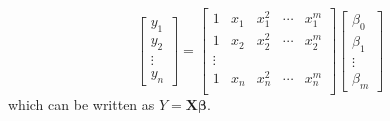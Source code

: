 $$
\begin{bmatrix}
y_1 \\ y_2\\ \vdots \\ y_n 
\end{bmatrix}=\begin{bmatrix}
1 & x_1 & x_1^2 &\cdots & x_1^m \\ 
1 & x_2 & x_2^2 &\cdots & x_2^m \\ 
\vdots \\ 
1 & x_n & x_n^2 &\cdots & x_n^m \\ 
\end{bmatrix}\begin{bmatrix}
\beta_0 \\ \beta_1 \\ \vdots \\ \beta_m 
\end{bmatrix}
$$ which can be written as $Y=\boldsymbol{X}\boldsymbol{\beta}$. 
 
